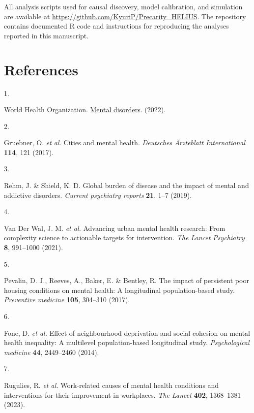 \documentclass[
]{article}
\newlength{\cslhangindent}
\newlength{\csllabelwidth}
\newenvironment{CSLReferences}[2] %
 {\begin{list}{}{%
  \setlength{\itemindent}{0pt}
  \setlength{\leftmargin}{0pt}
  \setlength{\parsep}{0pt}
  \ifodd #1
   \setlength{\leftmargin}{\cslhangindent}
   \setlength{\itemindent}{-1\cslhangindent}
  \fi
  \setlength{\itemsep}{#2\baselineskip}}}
 {\end{list}}
\newcommand{\CSLLeftMargin}[1]{\parbox[t]{\csllabelwidth}{\strut#1\strut}}
\newcommand{\CSLRightInline}[1]{\parbox[t]{\linewidth - \csllabelwidth}{\strut#1\strut}}
\begin{document}
All analysis scripts used for causal discovery, model calibration, and
simulation are available at
\url{https://github.com/KyuriP/Precarity_HELIUS}. The repository
contains documented R code and instructions for reproducing the analyses
reported in this manuscript.

\section{References}\label{references}

\label{refs}
\begin{CSLReferences}{0}{0}
\CSLLeftMargin{1. }%
\CSLRightInline{World Health Organization.
\href{https://www.who.int/news-room/fact-sheets/detail/mental-disorders}{Mental
disorders}. (2022).}

\CSLLeftMargin{2. }%
\CSLRightInline{Gruebner, O. \emph{et al.} Cities and mental health.
\emph{Deutsches {Ä}rzteblatt International} \textbf{114}, 121 (2017).}

\CSLLeftMargin{3. }%
\CSLRightInline{Rehm, J. \& Shield, K. D. Global burden of disease and
the impact of mental and addictive disorders. \emph{Current psychiatry
reports} \textbf{21}, 1--7 (2019).}

\CSLLeftMargin{4. }%
\CSLRightInline{Van Der Wal, J. M. \emph{et al.} Advancing urban mental
health research: From complexity science to actionable targets for
intervention. \emph{The Lancet Psychiatry} \textbf{8}, 991--1000
(2021).}

\CSLLeftMargin{5. }%
\CSLRightInline{Pevalin, D. J., Reeves, A., Baker, E. \& Bentley, R. The
impact of persistent poor housing conditions on mental health: A
longitudinal population-based study. \emph{Preventive medicine}
\textbf{105}, 304--310 (2017).}

\CSLLeftMargin{6. }%
\CSLRightInline{Fone, D. \emph{et al.} Effect of neighbourhood
deprivation and social cohesion on mental health inequality: A
multilevel population-based longitudinal study. \emph{Psychological
medicine} \textbf{44}, 2449--2460 (2014).}

\CSLLeftMargin{7. }%
\CSLRightInline{Rugulies, R. \emph{et al.} Work-related causes of mental
health conditions and interventions for their improvement in workplaces.
\emph{The Lancet} \textbf{402}, 1368--1381 (2023).}


\end{CSLReferences}
\end{document}
